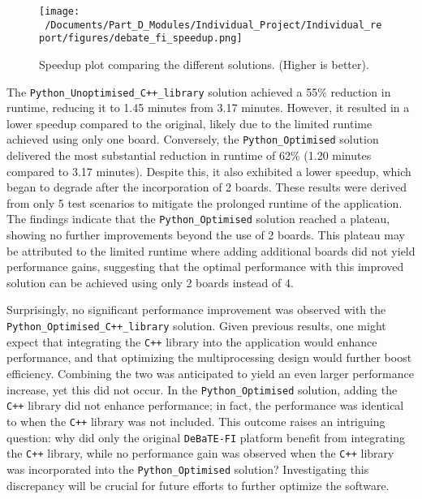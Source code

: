 \begin{figure}[htbp] %
	\centering
	\texttt{[image: ~/Documents/Part\_D\_Modules/Individual\_Project/Individual\_report/figures/debate\_fi\_speedup.png]} %
	\caption{Speedup plot comparing the different solutions. (Higher is better).}
	\label{fig:debate_fi_speedup} %
\end{figure}

The \texttt{Python\_Unoptimised\_C++\_library} solution achieved a 55\% reduction in runtime, reducing it to 1.45 minutes from 3.17 minutes. However, it resulted in a lower speedup compared to the original, likely due to the limited runtime achieved using only one board. Conversely, the \texttt{Python\_Optimised} solution delivered the most substantial reduction in runtime of 62\% (1.20 minutes compared to 3.17 minutes). Despite this, it also exhibited a lower speedup, which began to degrade after the incorporation of 2 boards. These results were derived from only 5 test scenarios to mitigate the prolonged runtime of the application. The findings indicate that the \texttt{Python\_Optimised} solution reached a plateau, showing no further improvements beyond the use of 2 boards. This plateau may be attributed to the limited runtime where adding additional boards did not yield performance gains, suggesting that the optimal performance with this improved solution can be achieved using only 2 boards instead of 4.

Surprisingly, no significant performance improvement was observed with the \texttt{Python\_Optimised\_C++\_library} solution. Given previous results, one might expect that integrating the \texttt{C++} library into the application would enhance performance, and that optimizing the multiprocessing design would further boost efficiency. Combining the two was anticipated to yield an even larger performance increase, yet this did not occur. In the \texttt{Python\_Optimised} solution, adding the \texttt{C++} library did not enhance performance; in fact, the performance was identical to when the \texttt{C++} library was not included. This outcome raises an intriguing question: why did only the original \texttt{DeBaTE-FI} platform benefit from integrating the \texttt{C++} library, while no performance gain was observed when the \texttt{C++} library was incorporated into the \texttt{Python\_Optimised} solution? Investigating this discrepancy will be crucial for future efforts to further optimize the software.

